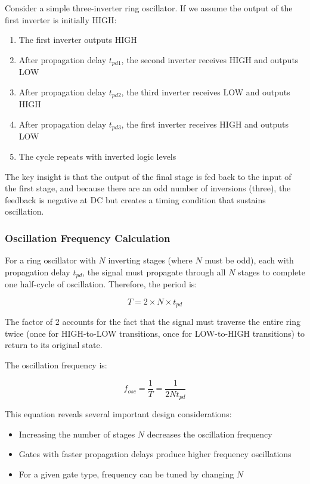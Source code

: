 \documentclass[10pt]{article}
\begin{document}
Consider a simple three-inverter ring oscillator. If we assume the output of the first inverter is initially HIGH: 

\begin{enumerate}
    \item The first inverter outputs HIGH
    \item After propagation delay $t_{pd1}$, the second inverter receives HIGH and outputs LOW
    \item After propagation delay $t_{pd2}$, the third inverter receives LOW and outputs HIGH
    \item After propagation delay $t_{pd3}$, the first inverter receives HIGH and outputs LOW
    \item The cycle repeats with inverted logic levels
\end{enumerate}

The key insight is that the output of the final stage is fed back to the input of the first stage, and because there are an odd number of inversions (three), the feedback is negative at DC but creates a timing condition that sustains oscillation.

\subsubsection{Oscillation Frequency Calculation}

For a ring oscillator with $N$ inverting stages (where $N$ must be odd), each with propagation delay $t_{pd}$, the signal must propagate through all $N$ stages to complete one half-cycle of oscillation. Therefore, the period is:

\begin{equation}
    T = 2 \times N \times t_{pd}
    \label{eq:period}
\end{equation}

The factor of 2 accounts for the fact that the signal must traverse the entire ring twice (once for HIGH-to-LOW transitions, once for LOW-to-HIGH transitions) to return to its original state.

The oscillation frequency is: 

\begin{equation}
    f_{osc} = \frac{1}{T} = \frac{1}{2 N t_{pd}}
    \label{eq:frequency}
\end{equation}

This equation reveals several important design considerations:

\begin{itemize}
    \item Increasing the number of stages $N$ decreases the oscillation frequency
    \item Gates with faster propagation delays produce higher frequency oscillations
    \item For a given gate type, frequency can be tuned by changing $N$
\end{itemize}
\end{document}
